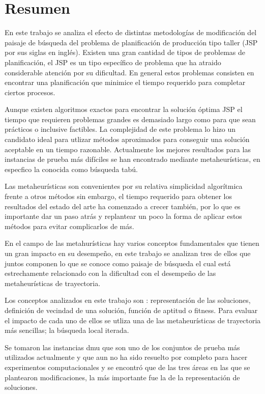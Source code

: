 \chapter*{Resumen}
En este trabajo se analiza el efecto de distintas metodologías de modificación del paisaje de búsqueda del problema de planificación de producción tipo taller (JSP por sus siglas en inglés). 
Existen una gran cantidad de tipos de problemas de planificación, el JSP es un tipo específico de problema que ha atraido considerable atención por su dificultad. En general estos problemas consisten en encontrar una planificación que minimice el tiempo requerido para completar ciertos procesos.  

Aunque existen algoritmos exactos para encontrar la solución óptima JSP\cite{Brucker1994} el tiempo que requieren problemas grandes es demasiado largo como para que sean prácticos o inclusive factibles. La complejidad de este problema lo hizo un candidato ideal para utlizar métodos aproximados para conseguir una solución aceptable en un tiempo razonable. Actualmente los mejores resultados para las instancias de prueba más difíciles se han encontrado mediante metaheurísticas, en especfico la conocida como búsqueda tabú.

Las metaheurísticas son convenientes por su relativa simplicidad algorítmica frente a otros métodos sin embargo, el tiempo requerido para obtener los resultados del estado del arte ha comenzado a crecer también, por lo que es importante dar un paso atrás y replantear un poco la forma de aplicar estos métodos para evitar complicarlos de más.


En el campo de las metahurísticas hay varios conceptos fundamentales que tienen un gran impacto en su desempeño, en este trabajo se analizan tres de ellos que juntos componen lo que se conoce como paisaje de búsqueda el cual está estrechamente relacionado con la dificultad con el desempeño de las metaheurísticas de trayectoria. 

Los conceptos analizados en este trabajo son : representación de las soluciones, definición de vecindad de una solución, función de aptitud o fitness. Para evaluar el impacto de cada uno de ellos se utliza una de las metaheurísticas de trayectoria más sencillas; la búsqueda local iterada. 

Se tomaron las instancias dmu que son uno de los conjuntos de prueba más utilizados actualmente y que aun no ha sido resuelto por completo para hacer experimentos computacionales y se encontró que de las tres áreas en las que se plantearon modificaciones, la más importante fue la de la representación de soluciones.

\let\cleardoublepage\clearpage



